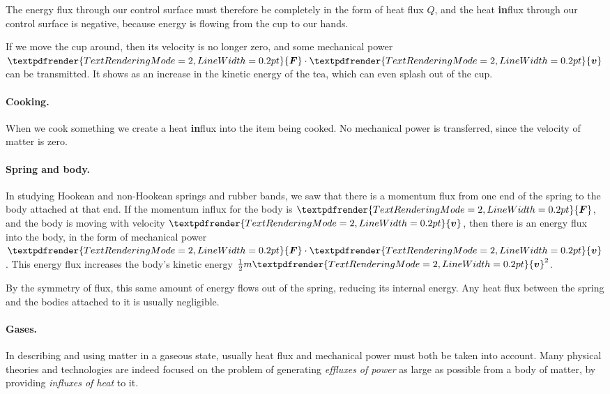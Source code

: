\documentclass[a4paper,12pt,%
onecolumn,oneside,%
british%
]{memoir}
\renewcommand*{\bm}[1]{\textpdfrender{TextRenderingMode=2,LineWidth=0.2pt}{\boldsymbol{#1}}}
\renewcommand*{\|}[1][]{\nonscript\:#1\vert\nonscript\:\mathopen{}}
\newcommand*{\yv}{\bm{v}}
\newcommand*{\ym}{m}%
\newcommand*{\yQ}{Q}%
\newcommand*{\yF}{\bm{F}}
\begin{document}
The energy flux through our control surface must therefore be completely in the form of heat flux $\yQ$, and the heat \textbf{in}flux through our control surface is negative, because energy is flowing from the cup to our hands.

If we move the cup around, then its velocity is no longer zero, and some mechanical power $\yF\cdot\yv$ can be transmitted. It shows as an increase in the kinetic energy of the tea, which can even splash out of the cup.

\paragraph{Cooking.}
When we cook something we create a heat \textbf{in}flux into the item being cooked. No mechanical power is transferred, since the velocity of matter is zero.

\paragraph{Spring and body.}
In studying Hookean and non-Hookean springs and rubber bands, we saw that there is a momentum flux from one end of the spring to the body attached at that end. If the momentum influx for the body is $\yF$, and the body is moving with velocity $\yv$, then there is an energy flux into the body, in the form of mechanical power $\yF\cdot \yv$. This energy flux increases the body's kinetic energy $\tfrac12\ym\yv^{2}$.

By the symmetry of flux, this same amount of energy flows out of the spring, reducing its internal energy. Any heat flux between the spring and the bodies attached to it is usually negligible.

\paragraph{Gases.}

In describing and using matter in a gaseous state, usually heat flux and mechanical power must both be taken into account. Many physical theories and technologies are indeed focused on the problem of generating \emph{effluxes of power} as large as possible from a body of matter, by providing \emph{influxes of heat} to it.
\end{document}
